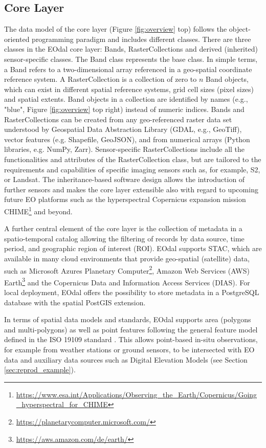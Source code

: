 \subsection{Core Layer}
The data model of the core layer (Figure \ref{fig:overview} top) follows the object-oriented programming paradigm and includes different classes. There are three classes in the \gls{EOdal} core layer: Bands, RasterCollections and derived (inherited) sensor-specific classes. The Band class represents the base class. In simple terms, a Band refers to a two-dimensional array referenced in a geo-spatial coordinate reference system. A RasterCollection is a collection of zero to $n$ Band objects, which can exist in different spatial reference systems, grid cell sizes (pixel sizes) and spatial extents. Band objects in a collection are identified by names (e.g., "blue", Figure \ref{fig:overview} top right) instead of numeric indices. Bands and RasterCollections can be created from any geo-referenced raster data set understood by Geospatial Data Abstraction Library (GDAL, e.g., GeoTiff), vector features (e.g. Shapefile, GeoJSON), and from numerical arrays (Python libraries, e.g. NumPy, Zarr). Sensor-specific RasterCollections include all the functionalities and attributes of the RasterCollection class, but are tailored to the requirements and capabilities of specific imaging sensors such as, for example, \gls{S2}, or Landsat. The inheritance-based software design allows the introduction of further sensors and makes the core layer extensible also with regard to upcoming future \gls{EO} platforms such as the hyperspectral Copernicus expansion mission CHIME\footnote{\url{https://www.esa.int/Applications/Observing_the_Earth/Copernicus/Going_hyperspectral_for_CHIME}} and beyond.

A further central element of the core layer is the collection of metadata in a spatio-temporal catalog  allowing the filtering of records by data source, time period, and geographic region of interest (ROI). \gls{EOdal} supports \gls{STAC}, which are available in many cloud environments that provide geo-spatial (satellite) data, such as Microsoft Azures Planetary Computer\footnote{\url{https://planetarycomputer.microsoft.com/}}, Amazon Web Services (AWS) Earth\footnote{\url{https://aws.amazon.com/de/earth/}} and the Copernicus Data and Information Access Services (DIAS). For local deployment, \gls{EOdal} offers the possibility to store metadata in a PostgreSQL database with the spatial PostGIS extension.

In terms of spatial data models and standards, \gls{EOdal} supports area (polygons and multi-polygons) as well as point features following the general feature model defined in the ISO 19109 standard \citep{iso_iso_2015}. This allows point-based in-situ observations, for example from weather stations or ground sensors, to be intersected with \gls{EO} data and auxiliary data sources such as Digital Elevation Models (see Section \ref{sec:reprod_example}).

